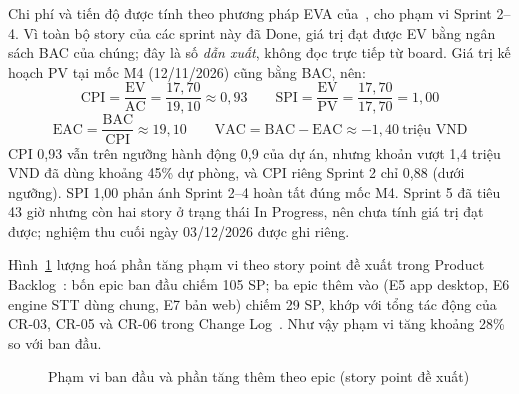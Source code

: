 \documentclass[12pt,a4paper]{report}
\begin{document}
Chi phí và tiến độ được tính theo phương pháp EVA của~\cite{mcr}, cho phạm vi Sprint 2--4. Vì toàn bộ story của
các sprint này đã Done, giá trị đạt được EV bằng ngân sách BAC của chúng; đây là số \emph{dẫn xuất}, không đọc trực
tiếp từ board. Giá trị kế hoạch PV tại mốc M4 (12/11/2026) cũng bằng BAC, nên:
\begin{equation*}
  \mathrm{CPI} = \frac{\mathrm{EV}}{\mathrm{AC}} = \frac{17{,}70}{19{,}10} \approx 0{,}93
  \qquad
  \mathrm{SPI} = \frac{\mathrm{EV}}{\mathrm{PV}} = \frac{17{,}70}{17{,}70} = 1{,}00
\end{equation*}
\begin{equation*}
  \mathrm{EAC} = \frac{\mathrm{BAC}}{\mathrm{CPI}} \approx 19{,}10
  \qquad
  \mathrm{VAC} = \mathrm{BAC} - \mathrm{EAC} \approx -1{,}40~\text{triệu VND}
\end{equation*}
CPI 0,93 vẫn trên ngưỡng hành động 0,9 của dự án, nhưng khoản vượt 1,4 triệu VND đã dùng khoảng 45\% dự phòng, và CPI
riêng Sprint 2 chỉ 0,88 (dưới ngưỡng). SPI 1,00
phản ánh Sprint 2--4 hoàn tất đúng mốc M4. Sprint 5 đã tiêu 43 giờ nhưng còn hai story ở trạng thái In Progress, nên
chưa tính giá trị đạt được; nghiệm thu cuối ngày 03/12/2026 được ghi riêng.

Hình~\ref{fig:scope} lượng hoá phần tăng phạm vi theo story point đề xuất trong Product Backlog~\cite{srs}: bốn
epic ban đầu chiếm 105 SP; ba epic thêm vào (E5 app desktop, E6 engine STT dùng chung, E7 bản web) chiếm 29 SP,
khớp với tổng tác động của CR-03, CR-05 và CR-06 trong Change Log~\cite{mcr}. Như vậy phạm vi tăng khoảng 28\% so
với ban đầu.

\begin{figure}[htbp]
  \centering
  \caption{Phạm vi ban đầu và phần tăng thêm theo epic (story point đề xuất)}
  \label{fig:scope}
\end{figure}
\end{document}
